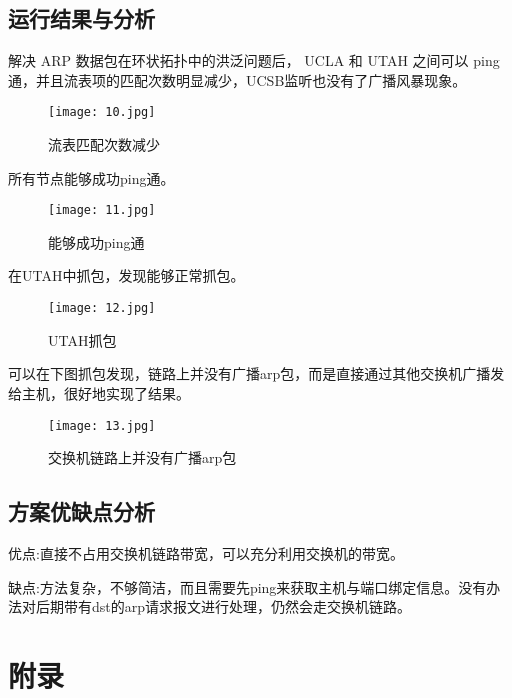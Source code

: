 \documentclass{xjtureport}
\begin{document}
\subsection{运行结果与分析}
解决 ARP 数据包在环状拓扑中的洪泛问题后， UCLA 和 UTAH 之间可以 ping 通，并且流表项的匹配次数明显减少，UCSB监听也没有了广播风暴现象。
\begin{figure}[H]
	\centering
	\texttt{[image: 10.jpg]}
	\caption{流表匹配次数减少}
\end{figure}
所有节点能够成功ping通。
\begin{figure}[H]
	\centering
	\texttt{[image: 11.jpg]}
	\caption{能够成功ping通}
\end{figure}
在UTAH中抓包，发现能够正常抓包。
\begin{figure}[H]
	\centering
	\texttt{[image: 12.jpg]}
	\caption{UTAH抓包}
\end{figure}
可以在下图抓包发现，链路上并没有广播arp包，而是直接通过其他交换机广播发给主机，很好地实现了结果。
\begin{figure}[H]
	\centering
	\texttt{[image: 13.jpg]}
	\caption{交换机链路上并没有广播arp包}
\end{figure}
\subsection{方案优缺点分析}
优点:直接不占用交换机链路带宽，可以充分利用交换机的带宽。\par 
缺点:方法复杂，不够简洁，而且需要先ping来获取主机与端口绑定信息。没有办法对后期带有dst的arp请求报文进行处理，仍然会走交换机链路。\par
\section{附录}
\end{document}
